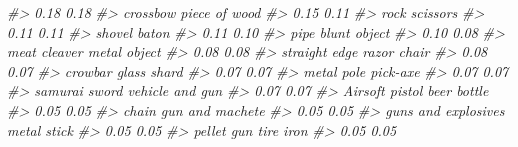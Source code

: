 \documentclass[
  12pt,
]{book}
\newenvironment{Shaded}{\begin{snugshade}}{\end{snugshade}}
\newcommand{\CommentTok}[1]{\textcolor[rgb]{0.37,0.37,0.37}{\textit{#1}}}
\begin{document}
\begin{Shaded}
\begin{Highlighting}[]
\CommentTok{\#\textgreater{}                             0.18                             0.18 }
\CommentTok{\#\textgreater{}                         crossbow                    piece of wood }
\CommentTok{\#\textgreater{}                             0.15                             0.11 }
\CommentTok{\#\textgreater{}                             rock                         scissors }
\CommentTok{\#\textgreater{}                             0.11                             0.11 }
\CommentTok{\#\textgreater{}                           shovel                            baton }
\CommentTok{\#\textgreater{}                             0.11                             0.10 }
\CommentTok{\#\textgreater{}                             pipe                     blunt object }
\CommentTok{\#\textgreater{}                             0.10                             0.08 }
\CommentTok{\#\textgreater{}                     meat cleaver                     metal object }
\CommentTok{\#\textgreater{}                             0.08                             0.08 }
\CommentTok{\#\textgreater{}              straight edge razor                            chair }
\CommentTok{\#\textgreater{}                             0.08                             0.07 }
\CommentTok{\#\textgreater{}                          crowbar                      glass shard }
\CommentTok{\#\textgreater{}                             0.07                             0.07 }
\CommentTok{\#\textgreater{}                       metal pole                         pick{-}axe }
\CommentTok{\#\textgreater{}                             0.07                             0.07 }
\CommentTok{\#\textgreater{}                    samurai sword                  vehicle and gun }
\CommentTok{\#\textgreater{}                             0.07                             0.07 }
\CommentTok{\#\textgreater{}                   Airsoft pistol                      beer bottle }
\CommentTok{\#\textgreater{}                             0.05                             0.05 }
\CommentTok{\#\textgreater{}                            chain                  gun and machete }
\CommentTok{\#\textgreater{}                             0.05                             0.05 }
\CommentTok{\#\textgreater{}              guns and explosives                      metal stick }
\CommentTok{\#\textgreater{}                             0.05                             0.05 }
\CommentTok{\#\textgreater{}                       pellet gun                        tire iron }
\CommentTok{\#\textgreater{}                             0.05                             0.05 }

\end{Highlighting}
\end{Shaded}
\end{document}
